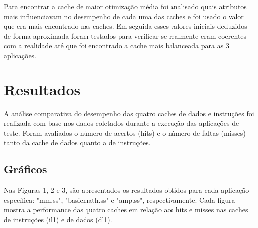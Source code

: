 \documentclass[12pt]{article}
\begin{document}
Para encontrar a cache de maior otimização média foi analisado quais atributos mais influenciavam no desempenho de cada uma das caches e foi usado o valor que era mais encontrado nas caches. Em seguida esses valores iniciais deduzidos de forma aproximada foram testados para verificar se realmente eram coerentes com a realidade até que foi encontrado a cache mais balanceada para as 3 aplicações.


\section{Resultados} \label{sec:resultados}
A análise comparativa do desempenho das quatro caches de dados e instruções foi realizada com base nos dados coletados durante a execução das aplicações de teste. Foram avaliados o número de acertos (hits) e o número de faltas (misses) tanto da cache de dados quanto a de instruções.


\subsection{Gráficos}
Nas Figuras 1, 2 e 3, são apresentados os resultados obtidos para cada aplicação específica: "mm.ss", "basicmath.ss" e "amp.ss", respectivamente. Cada figura mostra a performance das quatro caches em relação aos hits e misses nas caches de instruções (il1) e de dados (dl1).\\
\vspace{1cm}
\end{document}
